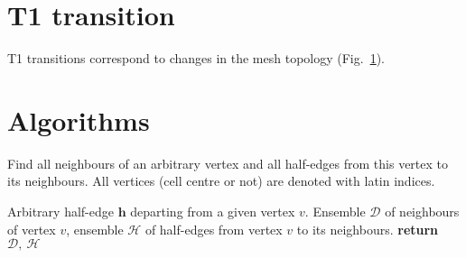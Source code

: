 \documentclass[aps, superscriptaddress, notitlepage]{revtex4-1}
\providecommand\RETURN{\STATE\textbf{return}~}
\def\scale{0.8}
\begin{document}
\section{T1 transition}

T1 transitions correspond to changes in the mesh topology (Fig.~\ref{fig:t1}).

\begin{figure}[H]
\centering
\begin{tikzpicture}[scale=0.25*\scale]

\end{tikzpicture}
\caption{}
\label{fig:t1}
\end{figure}

\begin{figure}[H]
\centering
\begin{tikzpicture}[scale=0.75*\scale]

\end{tikzpicture}
\caption{}
\label{fig:merge}
\end{figure}

\begin{figure}[H]
\centering
\begin{tikzpicture}[scale=0.75*\scale]

\end{tikzpicture}
\caption{}
\label{fig:create}
\end{figure}



\newpage
\appendix

\section{Algorithms}

\begin{algorithm}[H]
\caption{Find all neighbours of an arbitrary vertex and all half-edges from this vertex to its neighbours. All vertices (cell centre or not) are denoted with latin indices.}
\label{alg:neighbours}
\begin{algorithmic}[1]
\REQUIRE Arbitrary half-edge $\boldsymbol{h}$ departing from a given vertex $v$.
\ENSURE Ensemble $\mathcal{D}$ of neighbours of vertex $v$, ensemble $\mathcal{H}$ of half-edges from vertex $v$ to its neighbours.
 
 
\label{ins:while_neigh}
     
\ENDWHILE
\RETURN $\mathcal{D},~\mathcal{H}$
\end{algorithmic}
\end{algorithm}
\end{document}
